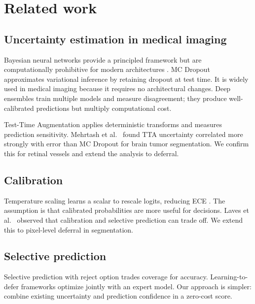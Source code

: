 \documentclass[review,3p]{elsarticle}
\begin{document}
\section{Related work}

\subsection{Uncertainty estimation in medical imaging}

Bayesian neural networks provide a principled framework but are computationally
prohibitive for modern architectures \citep{neal1996bayesian}. MC Dropout
\citep{gal2016dropout} approximates variational inference by retaining dropout
at test time. It is widely used in medical imaging
\citep{nair2020exploring,jungo2018effect,roy2019bayesian} because it requires
no architectural changes. Deep ensembles \citep{lakshminarayanan2017simple}
train multiple models and measure disagreement; they produce well-calibrated
predictions \citep{ovadia2019can} but multiply computational cost.

Test-Time Augmentation \citep{wang2019aleatoric,ayhan2018test,moshkov2020tta}
applies deterministic transforms and measures prediction sensitivity.
Mehrtash et al.\ \citep{mehrtash2020confidence} found TTA uncertainty
correlated more strongly with error than MC Dropout for brain tumor
segmentation. We confirm this for retinal vessels and extend the analysis
to deferral.

\subsection{Calibration}

Temperature scaling \citep{guo2017calibration} learns a scalar to rescale
logits, reducing ECE \citep{naeini2015obtaining}. The assumption is that
calibrated probabilities are more useful for decisions. Laves et al.\
\citep{laves2020well} observed that calibration and selective prediction can
trade off. We extend this to pixel-level deferral in segmentation.

\subsection{Selective prediction}

Selective prediction with reject option \citep{chow1970optimum,
el2010foundations,geifman2017selective} trades coverage for accuracy.
Learning-to-defer frameworks \citep{madras2018predict,mozannar2020consistent}
optimize jointly with an expert model. Our approach is simpler: combine
existing uncertainty and prediction confidence in a zero-cost score.
\end{document}
